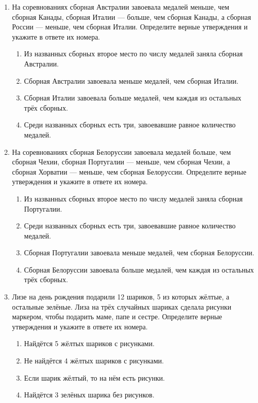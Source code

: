 \documentclass[a4paper,12pt]{article}
\newcommand{\taskspace}{\par\vspace{0.42cm}}
\begin{document}
\begin{enumerate}[resume]
\taskspace

\item На соревнованиях сборная Австралии завоевала медалей меньше, чем сборная Канады, сборная Италии --- больше, чем сборная Канады, а сборная России --- меньше, чем сборная Италии. Определите верные утверждения и укажите в ответе их номера.
\begin{enumerate}[label=\arabic*),leftmargin=8mm,itemsep=0.25em,topsep=0.35em]
\item Из названных сборных второе место по числу медалей заняла сборная Австралии.
\item Сборная Австралии завоевала меньше медалей, чем сборная Италии.
\item Сборная Италии завоевала больше медалей, чем каждая из остальных трёх сборных.
\item Среди названных сборных есть три, завоевавшие равное количество медалей.
\end{enumerate}

\taskspace

\item На соревнованиях сборная Белоруссии завоевала медалей больше, чем сборная Чехии, сборная Португалии --- меньше, чем сборная Чехии, а сборная Хорватии --- меньше, чем сборная Белоруссии. Определите верные утверждения и укажите в ответе их номера.
\begin{enumerate}[label=\arabic*),leftmargin=8mm,itemsep=0.25em,topsep=0.35em]
\item Из названных сборных второе место по числу медалей заняла сборная Португалии.
\item Среди названных сборных есть три, завоевавшие равное количество медалей.
\item Сборная Португалии завоевала меньше медалей, чем сборная Белоруссии.
\item Сборная Белоруссии завоевала больше медалей, чем каждая из остальных трёх сборных.
\end{enumerate}

\taskspace

\item Лизе на день рождения подарили 12 шариков, 5 из которых жёлтые, а остальные зелёные. Лиза на трёх случайных шариках сделала рисунки маркером, чтобы подарить маме, папе и сестре. Определите верные утверждения и укажите в ответе их номера.
\begin{enumerate}[label=\arabic*),leftmargin=8mm,itemsep=0.25em,topsep=0.35em]
\item Найдётся 5 жёлтых шариков с рисунками.
\item Не найдётся 4 жёлтых шариков с рисунками.
\item Если шарик жёлтый, то на нём есть рисунки.
\item Найдётся 3 зелёных шарика без рисунков.
\end{enumerate}

\taskspace

\end{enumerate}
\end{document}
